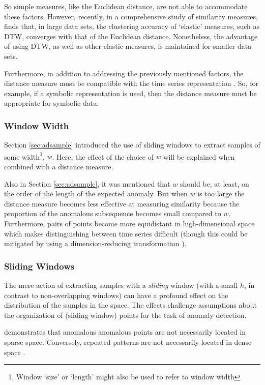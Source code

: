 So simple measures, like the Euclidean distance, are not able to accommodate these factors. However, recently, in a comprehensive study of similarity measures, \cite{Wang2013} finds that, in large data sets, the clustering accuracy of `elastic' measures, such as DTW, converges with that of the Euclidean distance. Nonetheless, the advantage of using DTW, as well as other elastic measures, is maintained for smaller data sets.

Furthermore, in addition to addressing the previously mentioned factors, the distance measure must be compatible with the time series representation \cite{Chakrabarti2002}. So, for example, if a symbolic representation is used, then the distance measure must be appropriate for symbolic data.


\subsubsection{Window Width}

Section \ref{sec:adsample} introduced the use of sliding windows to extract samples of some width\footnote{Window `size' or `length' might also be used to refer to window width}, $w$. Here, the effect of the choice of $w$ will be explained when combined with a distance measure.

Also in Section \ref{sec:adsample}, it was mentioned that $w$ should be, at least, on the order of the length of the expected anomaly. But when $w$ is too large the distance measure becomes less effective at measuring similarity because the proportion of the anomalous subsequence becomes small compared to $w$. Furthermore, pairs of points become more equidistant in high-dimensional space \cite{Hinneburg2000,Beyer1999} which makes distinguishing between time series difficult (though this could be mitigated by using a dimension-reducing transformation \cite{Keogh2001}).


\subsubsection{Sliding Windows}
\label{sec:sliding}

The mere action of extracting samples with a \emph{sliding} window (with a small $h$, in contrast to non-overlapping windows) can have a profound effect on the distribution of the samples in the space. The effects challenge assumptions about the organization of (sliding window) points for the task of anomaly detection.

\cite{Keogh2005} demonstrates that anomalous anomalous points are not necessarily located in sparse space. Conversely, repeated patterns are not necessarily located in dense space \cite{kitaguchi2004extracting,Chiu2003,Bentley1997}.


